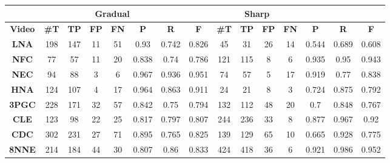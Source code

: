 \documentclass[journal]{IEEEtran}
\begin{document}
\begin{table*}[h]
\centering

\begin{tabular}{|c|c|c|c|c|c|c|c|c|c|c|c|c|c|c|}
\hline
 & \multicolumn{6}{c|}{\textbf{Gradual}} & \multicolumn{6}{c|}{\textbf{Sharp}}  \\ \hline
\textbf{Video}                & \textbf{\#T} & \textbf{TP} & \textbf{FP} & \textbf{FN} & \textbf{P} & \textbf{R} & \textbf{F} & \textbf{\#T} & \textbf{TP} & \textbf{FP} & \textbf{FN} & \textbf{P} & \textbf{R} & \textbf{F} \\ \hline
\textbf{LNA}          & 198           & 147         & 11          & 51          & 0.93       & 0.742      & 0.826      & 45            & 31          & 26          & 14          & 0.544      & 0.689      & 0.608      \\ \hline
\textbf{NFC}     & 77            & 57          & 11          & 20          & 0.838      & 0.74       & 0.786      & 121           & 115         & 8           & 6           & 0.935      & 0.95       & 0.943      \\ \hline
\textbf{NEC}     & 94            & 88          & 3           & 6           & 0.967      & 0.936      & 0.951      & 74            & 57          & 5           & 17          & 0.919      & 0.77       & 0.838      \\ \hline
\textbf{HNA}         & 124           & 107         & 4           & 17          & 0.964      & 0.863      & 0.911      & 24            & 21          & 8           & 3           & 0.724      & 0.875      & 0.792      \\ \hline
\textbf{3PGC} & 228           & 171         & 32          & 57          & 0.842      & 0.75       & 0.794      & 132           & 112         & 48          & 20          & 0.7        & 0.848      & 0.767      \\ \hline
\textbf{CLE}       & 123           & 98          & 22          & 25          & 0.817      & 0.797      & 0.807      & 244           & 236         & 33          & 8           & 0.877      & 0.967      & 0.92       \\ \hline
\textbf{CDC}         & 302           & 231         & 27          & 71          & 0.895      & 0.765      & 0.825      & 139           & 129         & 65          & 10          & 0.665      & 0.928      & 0.775      \\ \hline
\textbf{8NNE}    & 214           & 184         & 44          & 30          & 0.807      & 0.86       & 0.833      & 424           & 418         & 36          & 6           & 0.921      & 0.986      & 0.952      \\ \hline

\end{tabular}
\end{table*}
\end{document}
